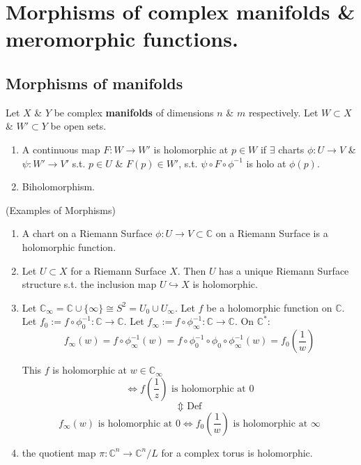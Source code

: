 \documentclass{article}
\begin{document}
\section{Morphisms of complex manifolds \& meromorphic functions.}

\subsection{Morphisms of manifolds}

\begin{definition}
    Let $X$ \& $Y$ be complex \textbf{manifolds} of dimensions $n$ \& $m$ respectively.
    Let $W \subset X$ \& $W' \subset Y$ be open sets.
    \begin{enumerate}
        \item A continuous map $F: W \to W'$ is holomorphic at $p \in W$
        if $\exists$ charts $\phi : U \to V$ \& $\psi : W' \to V'$ s.t. $p \in U$
        \& $F(p) \in W'$, s.t. $\psi \circ F \circ \phi^{-1}$ is holo at $\phi(p)$.
        \item Biholomorphism.
    \end{enumerate}
\end{definition}

\begin{example}(Examples of Morphisms)
\begin{enumerate}
    \item A chart on a Riemann Surface $\phi : U \to V \subset \mathbb{C}$ on a Riemann Surface is a holomorphic function.
    \item Let $U \subset X$ for a Riemann Surface $X$. Then $U$ has a unique Riemann Surface structure s.t. the inclusion map $U \hookrightarrow X$ is holomorphic.
    \item Let $\mathbb{C}_{\infty} = \mathbb{C} \cup \{\infty\} \cong S^2 = U_0 \cup U_{\infty}$.
    Let $f$ be a holomorphic function on $\mathbb{C}$.
    Let $f_0 := f \circ \phi_0^{-1} : \mathbb{C} \to \mathbb{C}$.
    Let $f_{\infty} := f \circ \phi_{\infty}^{-1} : \mathbb{C} \to \mathbb{C}$.
On $\mathbb{C}^*$:
$$
f_{\infty}(w) = f \circ \phi_{\infty}^{-1}(w) = f \circ \phi_0^{-1} \circ \phi_0 \circ \phi_{\infty}^{-1}(w) = f_0 \left(\frac{1}{w}\right)
$$

This $f$ is holomorphic at $w \in \mathbb{C}_{\infty}$
$$
\iff f\left(\frac{1}{z}\right) \text{ is holomorphic at } 0
$$
$$
\Updownarrow \text{ Def}
$$
$$
f_{\infty}(w) \text{ is holomorphic at } 0 \iff f_0 \left(\frac{1}{w}\right) \text{ is holomorphic at } \infty
$$
 \item the quotient map $\pi: \mathbb{C}^n \to \mathbb{C}^n/L$ for a complex torus is holomorphic.
\end{enumerate}
\end{example}
\end{document}
